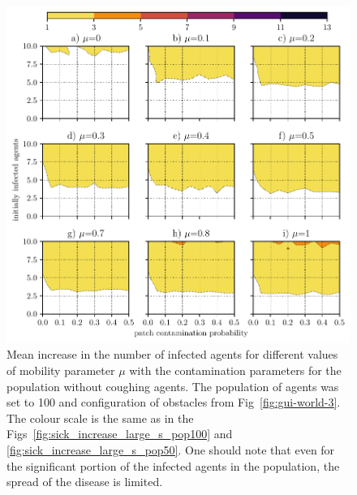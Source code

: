 \documentclass[11pt,a4paper]{article}
\begin{document}
\begin{figure}[ht!]
\includegraphics{plots/sick_increase_small_s_pop100_world-3.pdf}
\caption{Mean increase in the number of infected agents for different values of mobility parameter $\mu$ with the contamination parameters for the population without coughing agents. The population of agents was set to 100 and configuration of obstacles from Fig~\ref{fig:gui-world-3}. The colour scale is the same as in the Figs~\ref{fig:sick_increase_large_s_pop100} and \ref{fig:sick_increase_large_s_pop50}. One should note that even for the significant portion of the infected agents in the population, the spread of the disease is limited.}
\label{fig:sick_increase_small_s_pop100_world-3}
\end{figure}
\end{document}
